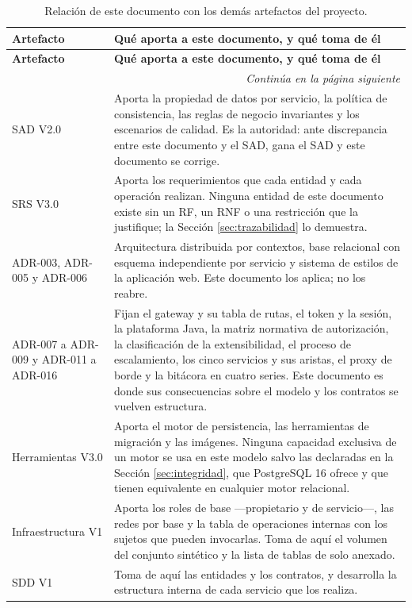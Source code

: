 \documentclass[11pt,a4paper]{article}
\newcommand{\contlinea}[1]{\multicolumn{#1}{r}{\footnotesize\itshape Continúa en la página siguiente}}
\begin{document}
\begin{longtable}{L{4.0cm} L{10.6cm}}
\caption{Relación de este documento con los demás artefactos del proyecto.}\label{tab:relacion}\\
\toprule
\textbf{Artefacto} & \textbf{Qué aporta a este documento, y qué toma de él} \\
\midrule
\endfirsthead
\toprule
\textbf{Artefacto} & \textbf{Qué aporta a este documento, y qué toma de él} \\
\midrule
\endhead
\midrule
\contlinea{2} \\
\endfoot
\bottomrule
\endlastfoot
SAD V2.0 & Aporta la propiedad de datos por servicio, la política de consistencia, las reglas de negocio invariantes y los escenarios de calidad. Es la autoridad: ante discrepancia entre este documento y el SAD, gana el SAD y este documento se corrige. \\
SRS V3.0 & Aporta los requerimientos que cada entidad y cada operación realizan. Ninguna entidad de este documento existe sin un RF, un RNF o una restricción que la justifique; la Sección \ref{sec:trazabilidad} lo demuestra. \\
ADR-003, ADR-005 y ADR-006 & Arquitectura distribuida por contextos, base relacional con esquema independiente por servicio y sistema de estilos de la aplicación web. Este documento los aplica; no los reabre. \\
ADR-007 a ADR-009 y ADR-011 a ADR-016 & Fijan el gateway y su tabla de rutas, el token y la sesión, la plataforma Java, la matriz normativa de autorización, la clasificación de la extensibilidad, el proceso de escalamiento, los cinco servicios y sus aristas, el proxy de borde y la bitácora en cuatro series. Este documento es donde sus consecuencias sobre el modelo y los contratos se vuelven estructura. \\
Herramientas V3.0 & Aporta el motor de persistencia, las herramientas de migración y las imágenes. Ninguna capacidad exclusiva de un motor se usa en este modelo salvo las declaradas en la Sección \ref{sec:integridad}, que PostgreSQL 16 ofrece y que tienen equivalente en cualquier motor relacional. \\
Infraestructura V1 & Aporta los roles de base ---propietario y de servicio---, las redes por base y la tabla de operaciones internas con los sujetos que pueden invocarlas. Toma de aquí el volumen del conjunto sintético y la lista de tablas de solo anexado. \\
SDD V1 & Toma de aquí las entidades y los contratos, y desarrolla la estructura interna de cada servicio que los realiza. \\
\end{longtable}
\end{document}
